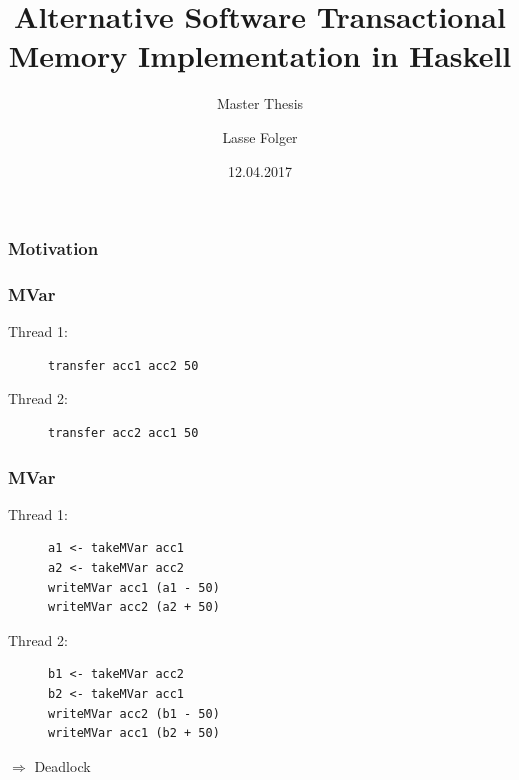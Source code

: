 \documentclass{beamer}
\author{Lasse Folger}
\title{\huge Alternative Software Transactional Memory Implementation in Haskell}
\subtitle{Master Thesis}
\date{12.04.2017}
\begin{document}
  \begin{frame}[t,plain]
    \titlepage
  \end{frame}
  
  
  \begin{frame}
    \frametitle{Motivation}
    
  \end{frame}
  
  \begin{frame}[fragile]
    \frametitle{MVar}
    \fboxsep=0pt
    \noindent
    \begin{minipage}[t]{0.48\linewidth}
      Thread 1:
            \begin{figure}
       \begin{lstlisting}[frame=single]
transfer acc1 acc2 50
       \end{lstlisting}
      \end{figure}
\end{minipage}%
    \hfill%
    \begin{minipage}[t]{0.48\linewidth}
      Thread 2:      
      \begin{figure}
       \begin{lstlisting}[frame=single]
transfer acc2 acc1 50
       \end{lstlisting}
      \end{figure}
    \end{minipage}
\end{frame}

  \begin{frame}[fragile]
    \frametitle{MVar}
    \fboxsep=0pt
    \noindent
    \begin{minipage}[t]{0.48\linewidth}
      Thread 1:
            \begin{figure}
       \begin{lstlisting}[frame=single]
a1 <- takeMVar acc1 
a2 <- takeMVar acc2 
writeMVar acc1 (a1 - 50)
writeMVar acc2 (a2 + 50)
       \end{lstlisting}
      \end{figure}
\end{minipage}%
    \hfill%
    \begin{minipage}[t]{0.48\linewidth}
      Thread 2:      
      \begin{figure}
       \begin{lstlisting}[frame=single]
b1 <- takeMVar acc2 
b2 <- takeMVar acc1 
writeMVar acc2 (b1 - 50)
writeMVar acc1 (b2 + 50)
       \end{lstlisting}
      \end{figure}
    \end{minipage}
    \vfill
    \pause
    $\Rightarrow$ Deadlock
\end{frame}
  
\end{document}
